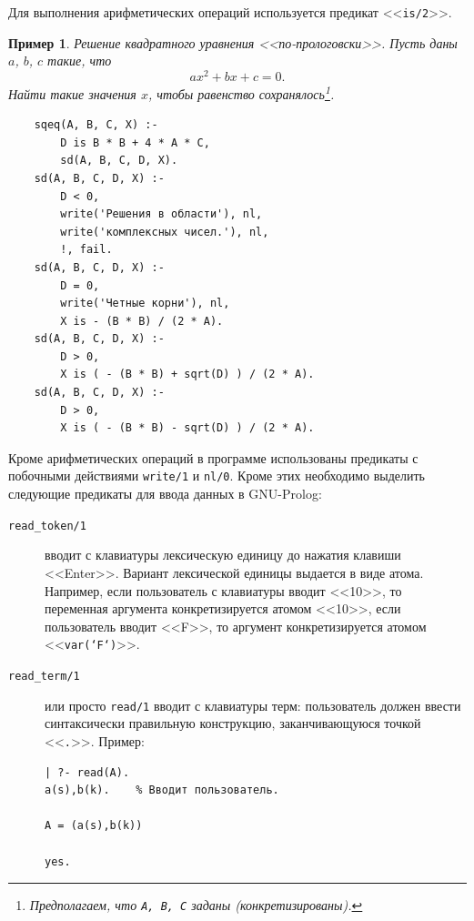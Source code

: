 \documentclass[12pt, openany, twoside]{book} %
\newtheorem{example}{Пример}[chapter]
\begin{document}
Для выполнения арифметических операций используется предикат <<{\tt is/2}>>.
\begin{example}
Решение квадратного уравнения <<по-прологовски>>. Пусть даны $a$, $b$, $c$ такие, что
$$
    ax^2+bx+c=0.
$$
Найти такие значения $x$, чтобы равенство сохранялось\footnote{Предполагаем, что {\tt A, B, C} заданы (конкретизированы).}.
\end{example}
{\tt\begin{verbatim}
    sqeq(A, B, C, X) :-
        D is B * B + 4 * A * C,
        sd(A, B, C, D, X).
    sd(A, B, C, D, X) :-
        D < 0,
        write('Решения в области'), nl,
        write('комплексных чисел.'), nl,
        !, fail.
    sd(A, B, C, D, X) :-
        D = 0,
        write('Четные корни'), nl,
        X is - (B * B) / (2 * A).
    sd(A, B, C, D, X) :-
        D > 0,
        X is ( - (B * B) + sqrt(D) ) / (2 * A).
    sd(A, B, C, D, X) :-
        D > 0,
        X is ( - (B * B) - sqrt(D) ) / (2 * A).
\end{verbatim}}

Кроме арифметических операций в программе использованы предикаты с побочными действиями {\tt write/1} и {\tt nl/0}. Кроме этих необходимо выделить следующие предикаты для ввода данных в GNU-Prolog:
\begin{description}
\item[\tt read\_token/1] вводит с клавиатуры лексическую единицу до нажатия клавиши <<Enter>>. Вариант лексической единицы выдается в виде атома. Например, если пользователь с клавиатуры вводит <<10>>, то переменная аргумента конкретизируется атомом <<10>>, если пользователь вводит <<F>>, то аргумент конкретизируется атомом <<\texttt{var(`F`)}>>.
\item[\tt read\_term/1] или просто \texttt{read/1} вводит с клавиатуры терм: пользователь должен ввести синтаксически правильную конструкцию, заканчивающуюся точкой <<\texttt{.}>>. Пример:
{\tt\begin{verbatim}
| ?- read(A).
a(s),b(k).    % Вводит пользователь.

A = (a(s),b(k))

yes.
\end{verbatim}}
\end{description}
\end{document}
